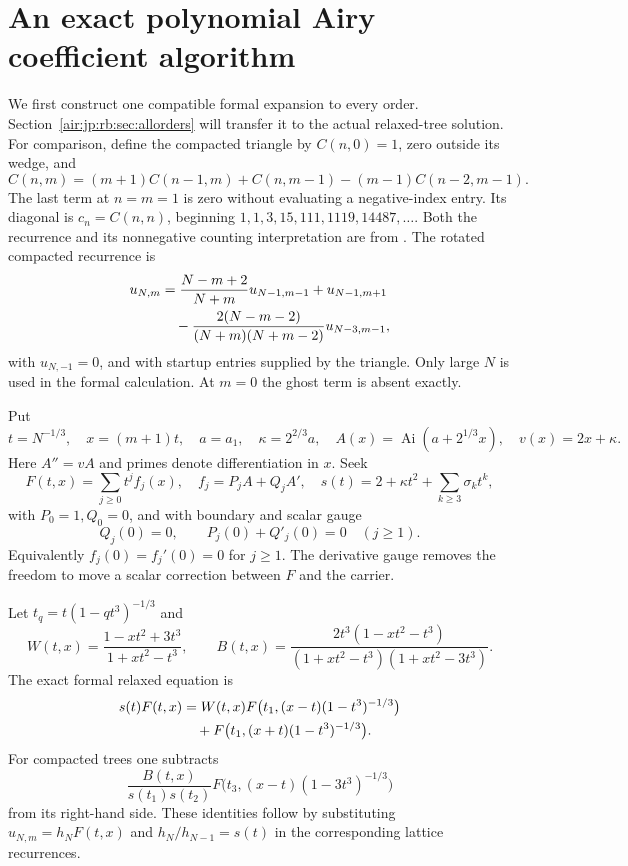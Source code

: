\documentclass[11pt,letterpaper]{article}
\numberwithin{equation}{section}
\theoremstyle{remark}
\newcommand{\Ai}{\operatorname{Ai}}
\begin{document}
\section{An exact polynomial Airy coefficient algorithm}\label{air:jp:rb:sec:formal}

We first construct one compatible formal expansion to every order. Section~\ref{air:jp:rb:sec:allorders} will transfer it to the actual relaxed-tree solution. For comparison, define the compacted triangle by $C(n,0)=1$, zero outside its wedge, and
\begin{equation}\label{air:jp:rb:eq:compacted}
 C(n,m)=(m+1)C(n-1,m)+C(n,m-1)-(m-1)C(n-2,m-1).
\end{equation}
The last term at $n=m=1$ is zero without evaluating a negative-index entry. Its diagonal is $c_n=C(n,n)$, beginning $1,1,3,15,111,1119,14487,\ldots$.
Both the recurrence and its nonnegative counting interpretation are from \cite{epfw}. The rotated compacted recurrence is
\begin{align}
 u_{N,m}&=\frac{N-m+2}{N+m}u_{N-1,m-1}+u_{N-1,m+1}\notag\\
 &\quad-\frac{2(N-m-2)}{(N+m)(N+m-2)}u_{N-3,m-1},\label{air:jp:rb:eq:compactedwalk}
\end{align}
with $u_{N,-1}=0$, and with startup entries supplied by the triangle. Only large $N$ is used in the formal calculation. At $m=0$ the ghost term is absent exactly.

Put
\[
 t=N^{-1/3},\quad x=(m+1)t,\quad a=a_1,\quad
 \kappa=2^{2/3}a,\quad A(x)=\Ai(a+2^{1/3}x),\quad v(x)=2x+\kappa.
\]
Here $A''=vA$ and primes denote differentiation in $x$. Seek
\begin{equation}\label{air:jp:rb:eq:formalansatz}
 F(t,x)=\sum_{j\ge0}t^jf_j(x),\quad f_j=P_jA+Q_jA',\quad
 s(t)=2+\kappa t^2+\sum_{k\ge3}\sigma_kt^k,
\end{equation}
with $P_0=1,Q_0=0$, and with boundary and scalar gauge
\begin{equation}\label{air:jp:rb:eq:formalgauge}
 Q_j(0)=0,\qquad P_j(0)+Q'_j(0)=0\quad(j\ge1).
\end{equation}
Equivalently $f_j(0)=f_j'(0)=0$ for $j\ge1$. The derivative gauge removes the freedom to move a scalar correction between $F$ and the carrier.

Let $t_q=t(1-qt^3)^{-1/3}$ and
\[
 W(t,x)=\frac{1-xt^2+3t^3}{1+xt^2-t^3},\qquad
 B(t,x)=\frac{2t^3(1-xt^2-t^3)}{(1+xt^2-t^3)(1+xt^2-3t^3)}.
\]
The exact formal relaxed equation is
\begin{align}
 s(t)F(t,x)
 &=W(t,x)F\bigl(t_1,(x-t)(1-t^3)^{-1/3}\bigr)\notag\\
 &\quad+F\bigl(t_1,(x+t)(1-t^3)^{-1/3}\bigr).\label{air:jp:rb:eq:formalequation}
\end{align}
For compacted trees one subtracts
\begin{equation}\label{air:jp:rb:eq:formalcompactextra}
 \frac{B(t,x)}{s(t_1)s(t_2)}
 F\bigl(t_3,(x-t)(1-3t^3)^{-1/3}\bigr)
\end{equation}
from its right-hand side. These identities follow by substituting $u_{N,m}=h_NF(t,x)$ and $h_N/h_{N-1}=s(t)$ in the corresponding lattice recurrences.
\end{document}
